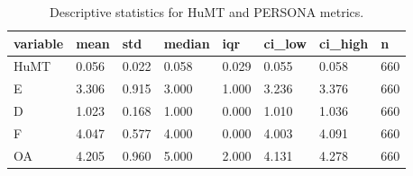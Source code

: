 \begin{table}[t]
\centering
\caption{Descriptive statistics for HuMT and PERSONA metrics.}
\label{tab:descriptives}
\begin{tabular}{llllllll}
\toprule
variable & mean & std & median & iqr & ci\_low & ci\_high & n \\
\midrule
HuMT & 0.056 & 0.022 & 0.058 & 0.029 & 0.055 & 0.058 & 660 \\
E & 3.306 & 0.915 & 3.000 & 1.000 & 3.236 & 3.376 & 660 \\
D & 1.023 & 0.168 & 1.000 & 0.000 & 1.010 & 1.036 & 660 \\
F & 4.047 & 0.577 & 4.000 & 0.000 & 4.003 & 4.091 & 660 \\
OA & 4.205 & 0.960 & 5.000 & 2.000 & 4.131 & 4.278 & 660 \\
\bottomrule
\end{tabular}
\end{table}
